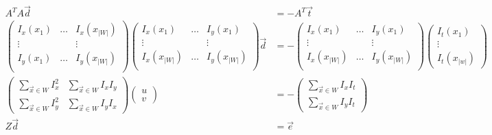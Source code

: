 \begin{align}  \label{eq:klt}
  A^TA\vec d &= -A^T \vec t\\
  \begin{pmatrix}
    I_x(x_1) & \hdots & I_x(x_{|W|}) \\
   \vdots &  & \vdots \\
  I_y(x_1) & \hdots & I_y(x_{|W|}) \\
  \end{pmatrix}
  \begin{pmatrix}
    I_x(x_1) & \hdots &   I_y(x_1)  \\
   \vdots &  & \vdots \\
I_x(x_{|W|})& \hdots & I_y(x_{|W|}) \\
  \end{pmatrix}
\vec d  &= -
  \begin{pmatrix}
    I_x(x_1) & \hdots &   I_y(x_1)  \\
   \vdots &  & \vdots \\
I_x(x_{|W|})& \hdots & I_y(x_{|W|}) \\
  \end{pmatrix}
  \begin{pmatrix}
    I_t(x_1)\\ \vdots \\ I_t(x_{|w|})
  \end{pmatrix}\\
\begin{pmatrix}
\sum_{\vec x\in W}  I_x^2 &\sum_{\vec x\in W} I_xI_y\\ \sum_{\vec x\in
  W} I_y^2 &\sum_{\vec x\in W} I_yI_x
\end{pmatrix}
\begin{pmatrix}
  u \\ v
\end{pmatrix}
 &=-
\begin{pmatrix}
 \sum_{\vec x\in W} I_xI_t\\ \sum_{\vec x\in W}I_yI_t
\end{pmatrix} \\
Z\vec d &= \vec e
\end{align}
